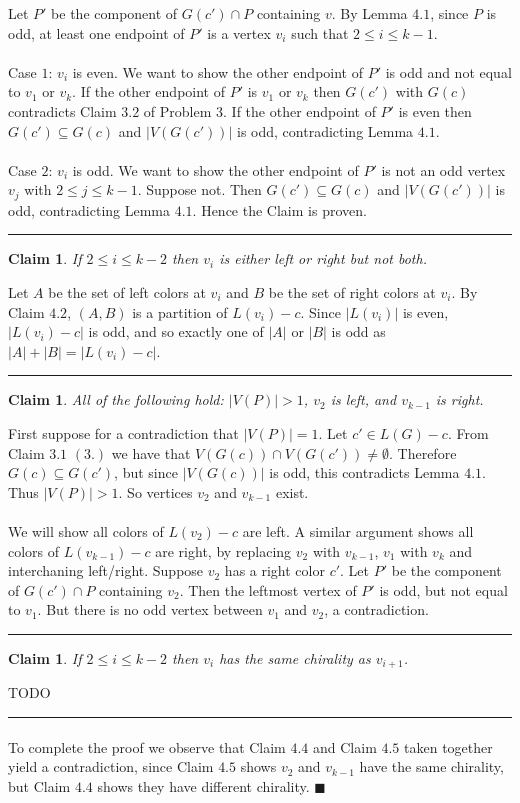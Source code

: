 \documentclass[letterpaper,12pt,oneside,onecolumn]{article}
\newenvironment{proof}{{\bf Proof:  }}{\hfill\rule{2mm}{2mm}}
\newtheorem{claim}[fact]{Claim}
\begin{document}
\begin{proof}
	Let $P'$ be the component of $G(c') \cap P$ containing $v$. By Lemma $4.1$, since $P$ is odd, at least one endpoint of $P'$ is a vertex $v_i$ such that $2\leq i\leq k-1$.
	\paragraph{}
	Case $1$: $v_i$ is even. We want to show the other endpoint of $P'$ is odd and not equal to $v_1$ or $v_k$. If the other endpoint of $P'$ is $v_1$ or $v_k$ then $G(c')$ with $G(c)$ contradicts Claim $3.2$ of Problem $3$.  If the other endpoint of $P'$ is even then $G(c') \subseteq G(c)$ and $|V(G(c'))|$ is odd, contradicting Lemma $4.1$.
	\paragraph{}
	Case $2$: $v_i$ is odd. We want to show the other endpoint of $P'$ is not an odd vertex $v_j$ with $2\leq j \leq k-1$. Suppose not. Then $G(c') \subseteq G(c)$ and $|V(G(c'))|$ is odd, contradicting Lemma $4.1$. Hence the Claim is proven.
\end{proof}
\begin{claim}
	If $2\leq i \leq k-2$ then $v_i$ is either left or right but not both.
\end{claim}
\begin{proof}
	Let $A$ be the set of left colors at $v_i$ and $B$ be the set of right colors at $v_i$. By Claim $4.2$, $(A,B)$ is a partition of $L(v_i) - c$. Since $|L(v_i)|$ is even, $|L(v_i)-c|$ is odd, and so exactly one of $|A|$ or $|B|$ is odd as $|A| + |B| = |L(v_i)-c|$.
\end{proof}
\begin{claim}
	All of the following hold: $|V(P)| > 1$, $v_2$ is left, and $v_{k-1}$ is right.
\end{claim}
\begin{proof}
	First suppose for a contradiction that $|V(P)| = 1$. Let $c' \in L(G) -c$. From Claim $3.1$ $(3.)$ we have that $V(G(c)) \cap V(G(c')) \neq \emptyset$. Therefore $G(c) \subseteq G(c')$, but since $|V(G(c))|$ is odd, this contradicts Lemma $4.1$. Thus $|V(P)| > 1$. So vertices $v_2$ and $v_{k-1}$ exist.
	\paragraph{}
	We will show all colors of $L(v_2) - c$ are left. A similar argument shows all colors of $L(v_{k-1})-c$ are right, by replacing $v_2$ with $v_{k-1}$, $v_1$ with $v_k$ and interchaning left/right. Suppose $v_2$ has a right color $c'$. Let $P'$ be the component of $G(c') \cap P$ containing $v_2$. Then the leftmost vertex of $P'$ is odd, but not equal to $v_1$. But there is no odd vertex between $v_1$ and $v_2$, a contradiction.
\end{proof}
\begin{claim}
	If $2\leq i \leq k-2$ then $v_i$ has the same chirality as $v_{i+1}$.
\end{claim}
\begin{proof}
	TODO
\end{proof}
\paragraph{}
To complete the proof we observe that Claim $4.4$ and Claim $4.5$ taken together yield a contradiction, since Claim $4.5$ shows $v_{2}$ and $v_{k-1}$ have the same chirality, but Claim $4.4$ shows they have different chirality. $\blacksquare$
\end{document}
